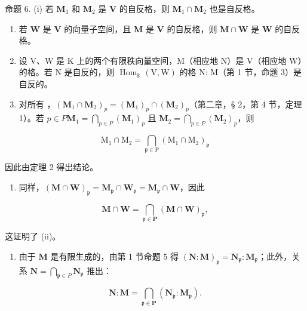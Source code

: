 命题 6. (i) 若 \(\mathbf{M}_1\) 和 \(\mathbf{M}_2\) 是 \(\mathbf{V}\) 的自反格，则 \(\mathbf{M}_1 \cap \mathbf{M}_2\) 也是自反格。

\begin{enumerate}
\def\labelenumi{(\roman{enumi})}
\setcounter{enumi}{1}
\item
  若 \(\mathbf{W}\) 是 \(\mathbf{V}\) 的向量子空间，且 \(\mathbf{M}\) 是 \(\mathbf{V}\) 的自反格，则 \(\mathbf{M} \cap \mathbf{W}\) 是 \(\mathbf{W}\) 的自反格。
\item
  设 V、W 是 K 上的两个有限秩向量空间，M（相应地 N）是 V（相应地 W）的格。若 N 是自反的，则 \(\operatorname{Hom}_{\mathbb{K}}(\mathrm{V}, \mathrm{W})\) 的格 N: M（第 1 节，命题 3）是自反的。
\item
  对所有 ，\((\mathbf{M}_1 \cap \mathbf{M}_2)_p = (\mathbf{M}_1)_p \cap (\mathbf{M}_2)_p\)（第二章，§ 2，第 4 节，定理 1）。若 \(p \in P\)\(\mathbf{M}_1 = \bigcap_{p \in P} (\mathbf{M}_1)_p\) 且 \(\mathbf{M}_2 = \bigcap_{p \in P} (\mathbf{M}_2)_p\)，则
\end{enumerate}

\[
\mathrm{M} _ {1} \cap \mathrm{M} _ {2} = \bigcap_ {\mathfrak {p} \in \mathrm{P}} (\mathrm{M} _ {1} \cap \mathrm{M} _ {2}) _ {\mathfrak {p}}
\]

因此由定理 2 得出结论。

\begin{enumerate}
\def\labelenumi{(\roman{enumi})}
\setcounter{enumi}{1}
\tightlist
\item
  同样，\((\mathbf{M} \cap \mathbf{W})_{\mathfrak{p}} = \mathbf{M}_{\mathfrak{p}} \cap \mathbf{W}_{\mathfrak{p}} = \mathbf{M}_{\mathfrak{p}} \cap \mathbf{W}\)，因此
\end{enumerate}

\[
\mathbf {M} \cap \mathbf {W} = \bigcap_ {\mathfrak {p} \in \mathbf {P}} (\mathbf {M} \cap \mathbf {W}) _ {\mathfrak {p}},
\]

这证明了 (ii)。

\begin{enumerate}
\def\labelenumi{(\roman{enumi})}
\setcounter{enumi}{2}
\tightlist
\item
  由于 \(\mathbf{M}\) 是有限生成的，由第 1 节命题 5 得 \((\mathbf{N}:\mathbf{M})_{\mathfrak{p}} = \mathbf{N}_{\mathfrak{p}}:\mathbf{M}_{\mathfrak{p}}\)；此外，关系 \(\mathbf{N} = \bigcap_{\mathfrak{p}\in P}\mathbf{N}_{\mathfrak{p}}\) 推出：
\end{enumerate}

\[
\mathbf {N}: \mathbf {M} = \bigcap_ {\mathfrak {p} \in \mathbf {P}} \left(\mathbf {N} _ {\mathfrak {p}}: \mathbf {M} _ {\mathfrak {p}}\right).
\]

